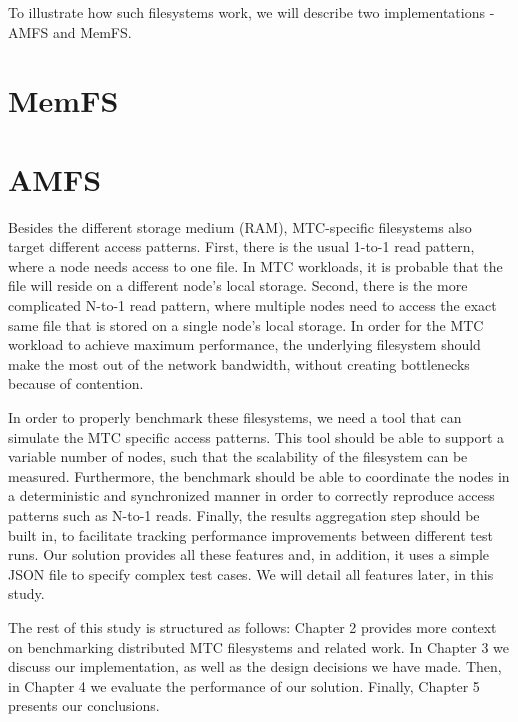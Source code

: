 To illustrate how such filesystems work, we will describe two implementations - AMFS\cite{amfs} and MemFS\cite{memfs}.

\section{MemFS}




\section{AMFS}





Besides the different storage medium (RAM), MTC-specific filesystems also target different access patterns. First, there is the usual 1-to-1 read pattern, where a node needs access to one file. In MTC workloads, it is probable that the file will reside on a different node's local storage. Second, there is the more complicated N-to-1 read pattern, where multiple nodes need to access the exact same file that is stored on a single node's local storage. In order for the MTC workload to achieve maximum performance, the underlying filesystem should make the most out of the network bandwidth, without creating bottlenecks because of contention.

In order to properly benchmark these filesystems, we need a tool that can simulate the MTC specific access patterns. This tool should be able to support a variable number of nodes, such that the scalability of the filesystem can be measured. Furthermore, the benchmark should be able to coordinate the nodes in a deterministic and synchronized manner in order to correctly reproduce access patterns such as N-to-1 reads. Finally, the results aggregation step should be built in, to facilitate tracking performance improvements between different test runs. Our solution provides all these features and, in addition, it uses a simple JSON\cite{json} file to specify complex test cases. We will detail all features later, in this study.


The rest of this study is structured as follows: Chapter 2 provides more context on benchmarking distributed MTC filesystems and related work. In Chapter 3 we discuss our implementation, as well as the design decisions we have made. Then, in Chapter 4 we evaluate the performance of our solution. Finally, Chapter 5 presents our conclusions.